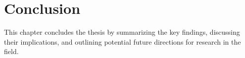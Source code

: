 \chapter{Conclusion}
\label{chapter5}

\begin{paragraph}
This chapter concludes the thesis by summarizing the key findings, discussing their implications, and outlining potential future directions for research in the field.
\end{paragraph}